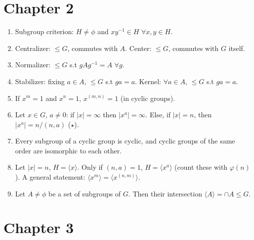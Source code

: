 \documentclass{article}
\begin{document}
\section*{Chapter 2}

\begin{enumerate}[1.]
    \item Subgroup criterion: $H \not= \phi$ and $xy^{-1} \in H$ $\forall x,y
        \in H$.
    \item Centralizer: $\leq G$, commutes with $A$. Center: $\leq G$,
        commutes with $G$ itself.
    \item Normalizer: $\leq G$ s.t $gAg^{-1} = A$ $\forall g$.
    \item Stabilizer: fixing $a \in A$, $\leq G$ s.t $ga = a$. Kernel:
        $\forall a \in A$, $\leq G$ s.t $ga = a$.
    \item If $x^m = 1$ and $x^n = 1$, $x^{(m, n)} = 1$ (in cyclic groups).
    \item Let $x \in G$, $a \not= 0$: if $|x| = \infty$ then $|x^a| =
        \infty$. Else, if $|x| = n$, then $|x^a| = n/(n, a)$ ($\star$).
    \item Every subgroup of a cyclic group is cyclic, and cyclic groups of
        the same order are isomorphic to each other.
    \item Let $|x| = n$, $H = \langle x \rangle$. Only if $(n, a) = 1$, $H =
        \langle x^a \rangle$ (count these with $\varphi(n)$).
        A general statement: $\langle x^m \rangle = \langle x^{(n, m)}
        \rangle$.
    \item Let $A \not= \phi$ be a set of subgroups of $G$. Then their
        intersection $\langle A \rangle = \cap A \leq G$.
\end{enumerate}

\section*{Chapter 3}
\end{document}
